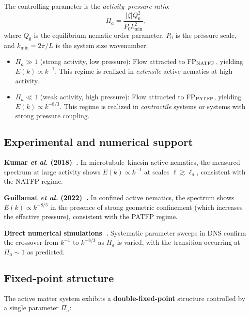 The controlling parameter is the \emph{activity--pressure ratio}:
\begin{equation}\label{eq:activity_param}
\Pi_a = \frac{|\zeta|Q_0^2}{P_0 k_{\min}^2},
\end{equation}
where $Q_0$ is the equilibrium nematic order parameter, $P_0$ is the pressure scale, and $k_{\min} = 2\pi/L$ is the system size wavenumber.

\begin{itemize}
\item $\Pi_a \gg 1$ (strong activity, low pressure): Flow attracted to FP$_{\text{NATFP}}$, yielding $E(k)\propto k^{-1}$. This regime is realized in \emph{extensile} active nematics at high activity.
\item $\Pi_a \ll 1$ (weak activity, high pressure): Flow attracted to FP$_{\text{PATFP}}$, yielding $E(k)\propto k^{-8/3}$. This regime is realized in \emph{contractile} systems or systems with strong pressure coupling.
\end{itemize}

\subsection{Experimental and numerical support}

\textbf{Kumar \textit{et al.} (2018)~\cite{kumar2018topological}.} In microtubule--kinesin active nematics, the measured spectrum at large activity shows $E(k)\propto k^{-1}$ at scales $\ell \gtrsim \ell_a$, consistent with the NATFP regime.

\textbf{Guillamat \textit{et al.} (2022)~\cite{guillamat2022observation}.} In confined active nematics, the spectrum shows $E(k)\propto k^{-8/3}$ in the presence of strong geometric confinement (which increases the effective pressure), consistent with the PATFP regime.

\textbf{Direct numerical simulations~\cite{doostmohammadi2017numerical,santra2021active}.} Systematic parameter sweeps in DNS confirm the crossover from $k^{-1}$ to $k^{-8/3}$ as $\Pi_a$ is varied, with the transition occurring at $\Pi_a \sim 1$ as predicted.

\subsection{Fixed-point structure}

The active matter system exhibits a \textbf{double-fixed-point} structure controlled by a single parameter $\Pi_a$:

